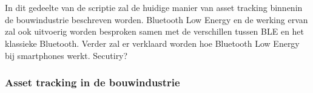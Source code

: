\chapter{}%
\label{ch:stand-van-zaken}



%
%

In dit gedeelte van de scriptie zal de huidige manier van asset tracking binnenin de bouwindustrie beschreven worden. Bluetooth Low Energy en de werking ervan zal ook uitvoerig worden besproken samen met de verschillen tussen BLE en het klassieke Bluetooth. Verder zal er verklaard worden hoe Bluetooth Low Energy bij smartphones werkt. Secutiry?

\subsection{Asset tracking in de bouwindustrie}

